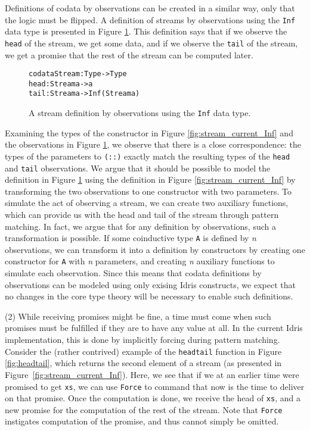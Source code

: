 Definitions of codata by observations can be created in a similar way, only that the logic must be flipped. A definition of streams by observations using the \texttt{Inf} data type is presented in Figure \ref{fig:stream_copatterns_Inf}. This definition says that if we observe the \texttt{head} of the stream, we get some data, and if we observe the \texttt{tail} of the stream, we get a promise that the rest of the stream can be computed later.

\begin{figure}
\begin{alltt}
codata Stream : Type -> Type
  head : Stream a -> a
  tail : Stream a -> Inf (Stream a)
\end{alltt}
\caption{A stream definition by observations using the \texttt{Inf} data type.}
\label{fig:stream_copatterns_Inf}
\end{figure}

Examining the types of the constructor in Figure \ref{fig:stream_current_Inf} and the observations in Figure \ref{fig:stream_copatterns_Inf}, we observe that there is a close correspondence: the types of the parameters to \texttt{(::)} exactly match the resulting types of the \texttt{head} and \texttt{tail} observations. We argue that it should be possible to model the definition in Figure \ref{fig:stream_copatterns_Inf} using the definition in Figure \ref{fig:stream_current_Inf} by transforming the two observations to one constructor with two parameters. To simulate the act of observing a stream, we can create two auxiliary functions, which can provide us with the head and tail of the stream through pattern matching. In fact, we argue that for any definition by observations, such a transformation is possible. If some coinductive type \texttt{A} is defined by \emph{n} observations, we can transform it into a definition by constructors by creating one constructor for \texttt{A} with \emph{n} parameters, and creating \emph{n} auxiliary functions to simulate each observation. Since this means that codata definitions by observations can be modeled using only exising Idris constructs, we expect that no changes in the core type theory will be necessary to enable such definitions.

(2) While receiving promises might be fine, a time must come when such promises must be fulfilled if they are to have any value at all. In the current Idris implementation, this is done by implicitly forcing during pattern matching. Consider the (rather contrived) example of the \texttt{headtail} function in Figure \ref{fig:headtail}, which returns the second element of a stream (as presented in Figure~\ref{fig:stream_current_Inf}). Here, we see that if we at an earlier time were promised to get \texttt{xs}, we can use \texttt{Force} to command that now is the time to deliver on that promise. Once the computation is done, we receive the head of \texttt{xs}, and a new promise for the computation of the rest of the stream. Note that \texttt{Force} instigates computation of the promise, and thus cannot simply be omitted.

